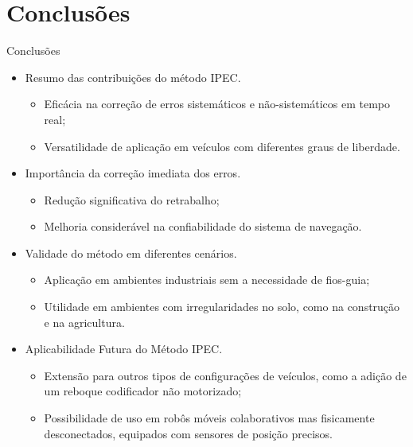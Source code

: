 \documentclass[xcolor=dvipsnames, aspectratio=169]{beamer}
\begin{document}
\section{Conclusões}
\begin{frame}{Conclusões}
  \begin{itemize}
    \item Resumo das contribuições do método IPEC.
      \begin{itemize}
        \item Eficácia na correção de erros sistemáticos e não-sistemáticos em tempo real;
        \item Versatilidade de aplicação em veículos com diferentes graus de liberdade.
      \end{itemize}
    \item Importância da correção imediata dos erros.
      \begin{itemize}
        \item Redução significativa do retrabalho;
        \item Melhoria considerável na confiabilidade do sistema de navegação.
      \end{itemize}
    \item Validade do método em diferentes cenários.
      \begin{itemize}
        \item Aplicação em ambientes industriais sem a necessidade de fios-guia;
        \item Utilidade em ambientes com irregularidades no solo, como na construção e na agricultura.
      \end{itemize}
    \item Aplicabilidade Futura do Método IPEC.
      \begin{itemize}
        \item Extensão para outros tipos de configurações de veículos, como a adição de um reboque codificador não motorizado;
        \item Possibilidade de uso em robôs móveis colaborativos mas fisicamente desconectados, equipados com sensores de posição precisos.
      \end{itemize}
  \end{itemize}
\end{frame}



\begin{frame}
    \printbibliography
\end{frame}


\begin{frame}
\titlepage %
\end{frame}
\end{document}

